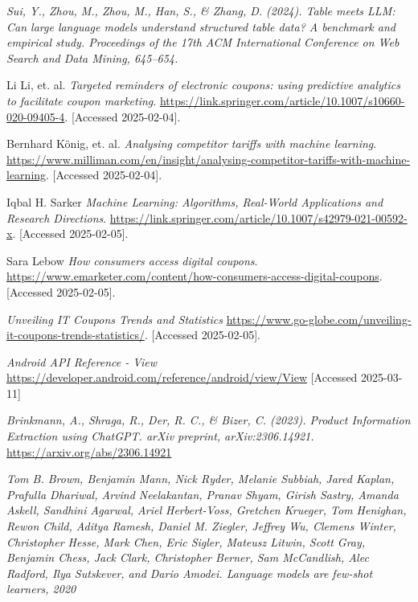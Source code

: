 \documentclass[licencjacka,en]{pracamgr}
\begin{document}
\begin{thebibliography}{99}
    \textit{Sui, Y., Zhou, M., Zhou, M., Han, S., \& Zhang, D. (2024). Table meets LLM: Can large language models understand structured table data? A benchmark and empirical study. Proceedings of the 17th ACM International Conference on Web Search and Data Mining, 645--654.}
    
    Li Li, et. al.
    \textit{Targeted reminders of electronic coupons: using predictive analytics to facilitate coupon marketing}.
    \url{https://link.springer.com/article/10.1007/s10660-020-09405-4}.
    [Accessed 2025-02-04].
    
    Bernhard König, et. al.
    \textit{Analysing competitor tariffs with machine learning}.
    \url{https://www.milliman.com/en/insight/analysing-competitor-tariffs-with-machine-learning}.
    [Accessed 2025-02-04].
    
    Iqbal H. Sarker
    \textit{Machine Learning: Algorithms, Real-World Applications and Research Directions}.
    \url{https://link.springer.com/article/10.1007/s42979-021-00592-x}.
    [Accessed 2025-02-05].
    
    Sara Lebow
    \textit{How consumers access digital coupons}.
    \url{https://www.emarketer.com/content/how-consumers-access-digital-coupons}.
    [Accessed 2025-02-05].
    
    \textit{Unveiling IT Coupons Trends and Statistics}
    \url{https://www.go-globe.com/unveiling-it-coupons-trends-statistics/}.
    [Accessed 2025-02-05].
    
    \textit{Android API Reference - View}
    \url{https://developer.android.com/reference/android/view/View}
    [Accessed 2025-03-11]
    
    \textit{Brinkmann, A., Shraga, R., Der, R. C., \& Bizer, C. (2023). Product Information Extraction using ChatGPT. arXiv preprint, arXiv:2306.14921.}
    \url{https://arxiv.org/abs/2306.14921}
    
    \textit{Tom B. Brown, Benjamin Mann, Nick Ryder, Melanie Subbiah, Jared
    Kaplan, Prafulla Dhariwal, Arvind Neelakantan, Pranav Shyam, Girish
    Sastry, Amanda Askell, Sandhini Agarwal, Ariel Herbert-Voss, Gretchen
    Krueger, Tom Henighan, Rewon Child, Aditya Ramesh, Daniel M.
    Ziegler, Jeffrey Wu, Clemens Winter, Christopher Hesse, Mark Chen,
    Eric Sigler, Mateusz Litwin, Scott Gray, Benjamin Chess, Jack Clark,
    Christopher Berner, Sam McCandlish, Alec Radford, Ilya Sutskever, and
    Dario Amodei. Language models are few-shot learners, 2020}
    

\end{thebibliography}
\end{document}
